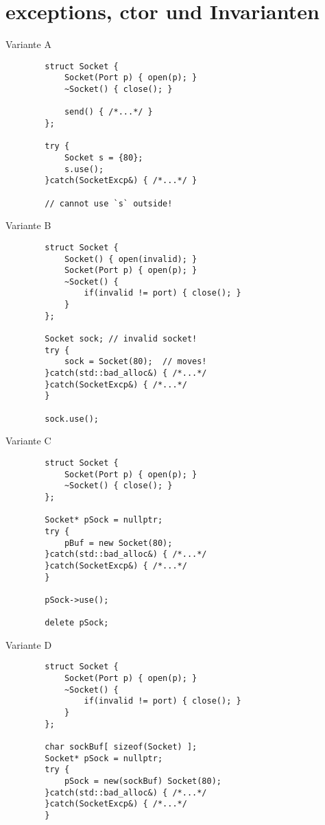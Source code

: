 \section{exceptions, ctor und Invarianten}

\begin{frame}[fragile]{ Variante A }
	\begin{lstlisting}
		struct Socket {
			Socket(Port p) { open(p); }
			~Socket() { close(); }
			
			send() { /*...*/ }
		};
		
		try {
			Socket s = {80};
			s.use();
		}catch(SocketExcp&) { /*...*/ }
		
		// cannot use `s` outside!
	\end{lstlisting}
\end{frame}

\begin{frame}[fragile]{ Variante B }
	\begin{lstlisting}
		struct Socket {
			Socket() { open(invalid); }
			Socket(Port p) { open(p); }
			~Socket() {
				if(invalid != port) { close(); }
			}
		};
		
		Socket sock; // invalid socket!
		try {
			sock = Socket(80);	// moves!
		}catch(std::bad_alloc&) { /*...*/
		}catch(SocketExcp&) { /*...*/
		}
		
		sock.use();
	\end{lstlisting}
\end{frame}

\begin{frame}[fragile]{ Variante C }
	\begin{lstlisting}
		struct Socket {
			Socket(Port p) { open(p); }
			~Socket() { close(); }
		};
		
		Socket* pSock = nullptr;
		try {
			pBuf = new Socket(80);
		}catch(std::bad_alloc&) { /*...*/
		}catch(SocketExcp&) { /*...*/
		}
		
		pSock->use();
		
		delete pSock;
	\end{lstlisting}
\end{frame}

\begin{frame}[fragile]{ Variante D }
	\begin{lstlisting}
		struct Socket {
			Socket(Port p) { open(p); }
			~Socket() {
				if(invalid != port) { close(); }
			}
		};
		
		char sockBuf[ sizeof(Socket) ];
		Socket* pSock = nullptr;
		try {
			pSock = new(sockBuf) Socket(80);
		}catch(std::bad_alloc&) { /*...*/
		}catch(SocketExcp&) { /*...*/
		}
		
	\end{lstlisting}
\end{frame}

